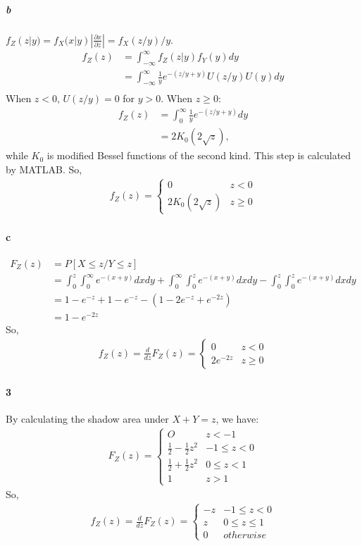 \documentclass[22pt]{article}
\begin{document}
		\subparagraph{b}
		$f_Z(z|y) = f_X(x|y)|\frac{\partial x}{\partial z}| = f_X(z/y)/y$.
		\begin{align}
		f_Z(z) & = \int_{-\infty}^{\infty}f_Z(z|y)f_Y(y)dy\\
		& = \int_{-\infty}^{\infty}\frac{1}{y}e^{-(z/y+y)}U(z/y)U(y) dy\\
		\end{align}
		When $z <0$, $U(z/y) = 0$ for $ y > 0$.
		When $z \geq 0$:
		\begin{align}
		f_Z(z)& = \int_{0}^{\infty} \frac{1}{y}e^{-(z/y+y)} dy\\
		 & = 2K_0(2\sqrt{z}),
		\end{align}
		while $K_0$ is modified Bessel functions of the second kind. This step is calculated by MATLAB.
		So, \begin{align}
	    f_Z(z) =  
					\begin{cases}
					0 & z < 0 \\
					2K_0(2\sqrt{z}) &  z \geq 0
					\end{cases}
		\end{align}

		\paragraph{c}
		\begin{align}
		F_Z(z) & = P[X\leq z/ Y\leq z]\\
		& = \int_{0}^{z} \int_{0}^{\infty} e^{-(x+y)} dxdy + \int_{0}^{\infty} \int_{0}^{z} e^{-(x+y)} dxdy - \int_{0}^{z} \int_{0}^{z} e^{-(x+y)} dxdy\\
		& = 1-e^{-z} + 1 -e^{-z}-( 1- 2e^{-z} + e^{-2z})\\
		& = 1-e^{-2z}
		\end{align}
		So, \begin{align}
		f_Z(z) = \frac{d}{dz}F_Z(z) =
				\begin{cases}
				0 & z < 0\\
				2e^{-2z} &  z \geq 0
				\end{cases}
	\end{align}

	\paragraph{3}
	By calculating the shadow area under $X+Y = z$, we have:
	\begin{align}
	F_Z(z)  =
				\begin{cases}
				O & z < -1\\
				\frac{1}{2}- \frac{1}{2}z^2 &  -1 \leq z  < 0\\
				\frac{1}{2} + \frac{1}{2}z^2 & 0\leq z < 1\\
				1 &z>1
				\end{cases}
	\end{align}
	So, \begin{align}
			f_Z(z) = \frac{d}{dz}F_Z(z) =
					\begin{cases}
					-z & -1\leq z <0\\
					z  &  0 \leq z \leq 1\\
					0 & otherwise
					\end{cases}
		\end{align}
\end{document}
